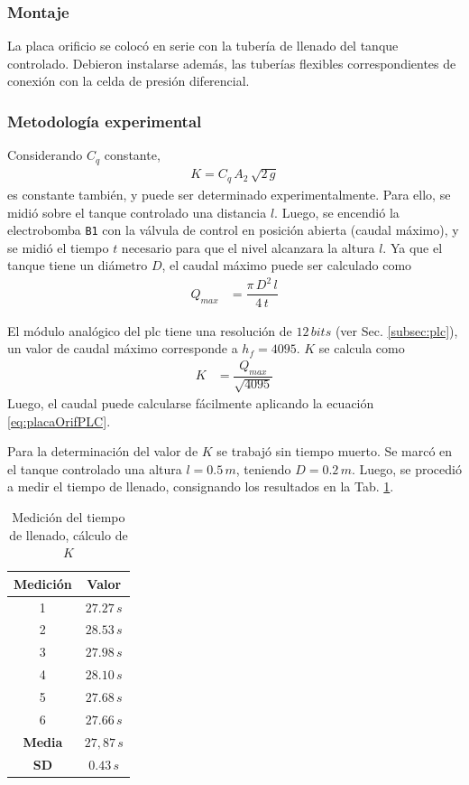 \subsubsection{Montaje}
La placa orificio se colocó en serie con la tubería de llenado del
tanque controlado.
Debieron instalarse además, las tuberías flexibles correspondientes de conexión
con la celda de presión diferencial.

\subsubsection{Metodología experimental}
Considerando $C_q$ constante,
\begin{align}
 K = C_q\, A_2\, \sqrt{2\,g}
\end{align}
es constante también, y puede ser determinado experimentalmente.
Para ello, se midió sobre el tanque controlado una distancia $l$.
Luego, se encendió la electrobomba \verb|B1| con la válvula de control en
posición
abierta (caudal máximo), y se midió el tiempo $t$ necesario para que el nivel
alcanzara la altura $l$.
Ya que el tanque tiene un diámetro $D$, el caudal máximo puede ser
calculado como
\begin{align}
 Q_{max} &= \dfrac{\pi\,D^2\,l}{4\,t}
\end{align}

El módulo analógico del \gls{plc} tiene una resolución de $12\,bits$
(ver Sec. \ref{subsec:plc}), un valor de caudal máximo corresponde a $h_f =
4095$.
$K$ se calcula como
\begin{align}
 K &= \dfrac{Q_{max}}{\sqrt{4095}}
\end{align}
Luego, el caudal puede calcularse fácilmente aplicando la ecuación
\eqref{eq:placaOrifPLC}.

Para la determinación del valor de $K$ se trabajó sin tiempo muerto.
Se marcó en el tanque controlado una altura $l=0.5\,m$, teniendo $D=0.2\,m$.
Luego, se procedió a medir el tiempo de llenado, consignando los resultados en
la Tab. \ref{tab:tiempoK}.

\begin{table}[ht]
\renewcommand{\arraystretch}{1.3}
  \centering
  \bgroup
  \begin{tabular}{|c|c|}
  \hline
  Medición & Valor\\
  \hline
  1 & $27.27\,s$ \\
  2 & $28.53\,s$ \\
  3 & $27.98\,s$ \\
  4 & $28.10\,s$ \\
  5 & $27.68\,s$ \\
  6 & $27.66\,s$ \\
  \hline
  \hline
  \textbf{Media} & $27,87\,s$\\
  \textbf{SD} & $0.43\,s$\\
  \hline
  \end{tabular}
  \egroup
  \caption{Medición del tiempo de llenado, cálculo de $K$}
  \label{tab:tiempoK}
\end{table}

